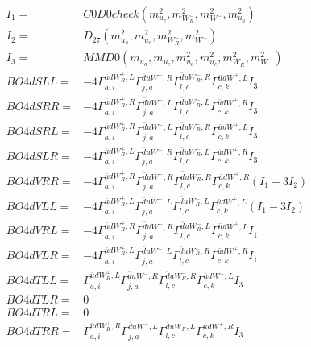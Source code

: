 \documentclass[A4,landscape]{article}
\begin{document}
\begin{align} 
I_1 = & C0D0check(m^2_{u_{{c}}}, m^2_{W_R^-}, m^2_{W^-}, m^2_{u_{{a}}}) \\ 
I_2 = & D_{27}(m^2_{u_{{a}}}, m^2_{u_{{c}}}, m^2_{W_R^-}, m^2_{W^-}) \\ 
I_3 = & MMD0(m_{u_{{a}}}, m_{u_{{c}}}, m^2_{u_{{a}}}, m^2_{u_{{c}}}, m^2_{W_R^-}, m^2_{W^-}) \\ 
  BO4dSLL= & -4  \Gamma^{\bar{u}d W_R^+,L}_{a, i} \Gamma^{\bar{d}u W^- ,R}_{j, a} \Gamma^{\bar{d}u W_R^- ,R}_{l, c} \Gamma^{\bar{u}d W^+,L}_{c, k} I_3 \\ 
  BO4dSRR= & -4  \Gamma^{\bar{u}d W_R^+,R}_{a, i} \Gamma^{\bar{d}u W^- ,L}_{j, a} \Gamma^{\bar{d}u W_R^- ,L}_{l, c} \Gamma^{\bar{u}d W^+,R}_{c, k} I_3 \\ 
  BO4dSRL= & -4  \Gamma^{\bar{u}d W_R^+,R}_{a, i} \Gamma^{\bar{d}u W^- ,L}_{j, a} \Gamma^{\bar{d}u W_R^- ,R}_{l, c} \Gamma^{\bar{u}d W^+,L}_{c, k} I_3 \\ 
  BO4dSLR= & -4  \Gamma^{\bar{u}d W_R^+,L}_{a, i} \Gamma^{\bar{d}u W^- ,R}_{j, a} \Gamma^{\bar{d}u W_R^- ,L}_{l, c} \Gamma^{\bar{u}d W^+,R}_{c, k} I_3 \\ 
  BO4dVRR= & -4  \Gamma^{\bar{u}d W_R^+,R}_{a, i} \Gamma^{\bar{d}u W^- ,R}_{j, a} \Gamma^{\bar{d}u W_R^- ,R}_{l, c} \Gamma^{\bar{u}d W^+,R}_{c, k} (I_1 - 3 I_2) \\ 
  BO4dVLL= & -4  \Gamma^{\bar{u}d W_R^+,L}_{a, i} \Gamma^{\bar{d}u W^- ,L}_{j, a} \Gamma^{\bar{d}u W_R^- ,L}_{l, c} \Gamma^{\bar{u}d W^+,L}_{c, k} (I_1 - 3 I_2) \\ 
  BO4dVRL= & -4  \Gamma^{\bar{u}d W_R^+,R}_{a, i} \Gamma^{\bar{d}u W^- ,R}_{j, a} \Gamma^{\bar{d}u W_R^- ,L}_{l, c} \Gamma^{\bar{u}d W^+,L}_{c, k} I_1 \\ 
  BO4dVLR= & -4  \Gamma^{\bar{u}d W_R^+,L}_{a, i} \Gamma^{\bar{d}u W^- ,L}_{j, a} \Gamma^{\bar{d}u W_R^- ,R}_{l, c} \Gamma^{\bar{u}d W^+,R}_{c, k} I_1 \\ 
  BO4dTLL= &  \Gamma^{\bar{u}d W_R^+,L}_{a, i} \Gamma^{\bar{d}u W^- ,R}_{j, a} \Gamma^{\bar{d}u W_R^- ,R}_{l, c} \Gamma^{\bar{u}d W^+,L}_{c, k} I_3 \\ 
  BO4dTLR= & 0 \\ 
  BO4dTRL= & 0 \\ 
  BO4dTRR= &  \Gamma^{\bar{u}d W_R^+,R}_{a, i} \Gamma^{\bar{d}u W^- ,L}_{j, a} \Gamma^{\bar{d}u W_R^- ,L}_{l, c} \Gamma^{\bar{u}d W^+,R}_{c, k} I_3 \\ 
\end{align} 
\end{document}
